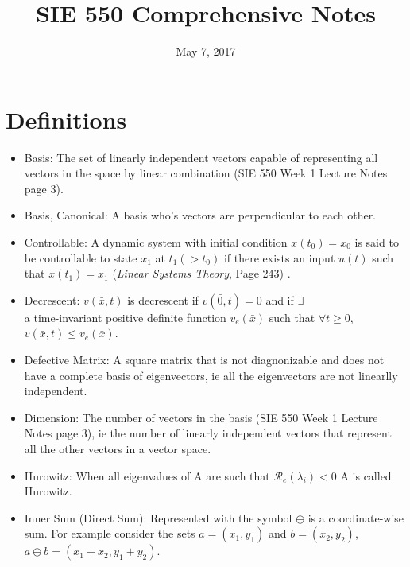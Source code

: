 \documentclass[12pt]{article}
\begin{document}
\title{SIE 550 Comprehensive Notes}
\date{May 7, 2017}
\maketitle

\section*{Definitions}

\begin{itemize}

\item Basis: The set of linearly independent vectors capable of representing all vectors in the space by linear combination (SIE 550 Week 1 Lecture Notes page 3).

\item Basis, Canonical: A basis who's vectors are perpendicular to each other. 

\item Controllable: A dynamic system with initial condition $x(t_0)=x_0$ is said to be controllable to state $x_1$ at $t_1(>t_0)$ if there exists an input $u(t)$ such that $x(t_1)=x_1$ ({\em Linear Systems Theory}, Page 243)  .

\item Decrescent: $v(\bar{x},t)$ is decrescent if $v(\bar{0},t)=0$ and if $\exists$ \\ a time-invariant positive definite function $v_e(\bar{x})$ such that $\forall t\geq0$, $v(\bar{x},t)\leq v_e(\bar{x})$.

\item Defective Matrix: A square matrix that is not diagnonizable and does not have a complete basis of eigenvectors, ie all the eigenvectors are not linearlly independent. 

\item Dimension: The number of vectors in the basis (SIE 550 Week 1 Lecture Notes page 3), ie the number of linearly independent vectors that represent all the other vectors in a vector space.

\item Hurowitz: When all eigenvalues of A are such that $\mathcal{R}_e(\lambda_i)<0$ A is called Hurowitz. 

\item Inner Sum (Direct Sum): Represented with the symbol $\oplus$ is a coordinate-wise sum. For example consider the sets $a=(x_1,y_1)$ and $b=(x_2, y_2)$, $a\oplus b=(x_1+x_2,y_1+y_2)$.


\end{itemize}
\end{document}
